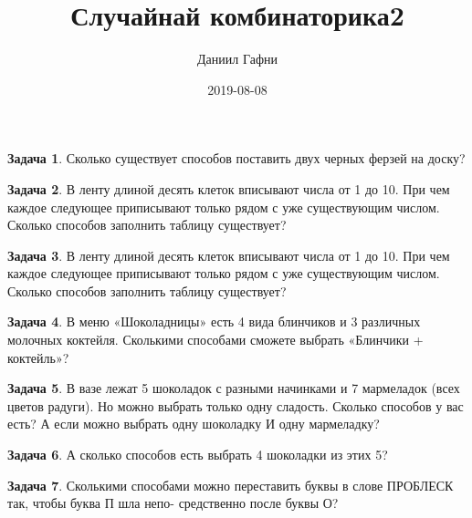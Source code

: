 \documentclass[a4paper,11pt]{article}%
\title{Случайнай комбинаторика2}%
\author{Даниил Гафни}%
\date{2019{-}08{-}08}%
\theoremstyle{definition}%
\newtheorem{Ex}{\hspace{-25pt}\fbox{\phantom{123}} Задача}%
\begin{document}
%
\normalsize%
\maketitle%
\begin{Ex}%
Сколько существует способов поставить двух черных ферзей на доску?%
%
\end{Ex}%
%
\iffalse%
Автор: Нина%
Дата: 2013%
Название: %
Подсказка: \textbackslash{}\textbackslash{}%
nan%
\fi%
%
\begin{Ex}%
В ленту длиной десять клеток вписывают числа от 1 до 10. При чем каждое следующее приписывают только рядом с уже существующим числом. Сколько способов заполнить таблицу существует?%
%
\end{Ex}%
%
\iffalse%
Автор: Нина%
Дата: 2013%
Название: %
Подсказка: \textbackslash{}\textbackslash{}%
nan%
\fi%
%
\begin{Ex}%
В ленту длиной десять клеток вписывают числа от 1 до 10. При чем каждое следующее приписывают только рядом с уже существующим числом. Сколько способов заполнить таблицу существует?%
%
\end{Ex}%
%
\iffalse%
Автор: Нина%
Дата: 2013%
Название: %
Подсказка: \textbackslash{}\textbackslash{}%
nan%
\fi%
%
\begin{Ex}%
В меню «Шоколадницы» есть 4 вида блинчиков и 3 различных молочных коктейля.
Сколькими способами сможете выбрать «Блинчики + коктейль»?%
%
\end{Ex}%
%
\iffalse%
Автор: ЗМШ%
Дата: 2012%
Название: %
Подсказка: \textbackslash{}\textbackslash{}%
nan%
\fi%
%
\begin{Ex}%
В вазе лежат 5 шоколадок с разными начинками и 7 мармеладок (всех цветов
радуги). Но можно выбрать только одну сладость. Сколько способов у вас есть? А
если можно выбрать одну шоколадку И одну мармеладку?%
%
\end{Ex}%
%
\iffalse%
Автор: ЗМШ%
Дата: 2012%
Название: %
Подсказка: \textbackslash{}\textbackslash{}%
nan%
\fi%
%
\begin{Ex}%
А сколько способов есть выбрать 4 шоколадки из этих 5?%
%
\end{Ex}%
%
\iffalse%
Автор: ЗМШ%
Дата: 2012%
Название: %
Подсказка: \textbackslash{}\textbackslash{}%
nan%
\fi%
%
\begin{Ex}%
Сколькими способами можно переставить буквы в слове ПРОБЛЕСК так, чтобы буква П шла непо-
средственно после буквы О?%
%
\end{Ex}%
%
\iffalse%
Автор: ЗМШ%
Дата: 2013%
Название: %
Подсказка: \textbackslash{}\textbackslash{}%
nan%
\fi%
%
\end{document}
